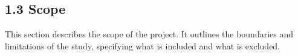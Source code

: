 \subsection{1.3 Scope}

This section describes the scope of the project. It outlines the boundaries and limitations of the study, specifying what is included and what is excluded.